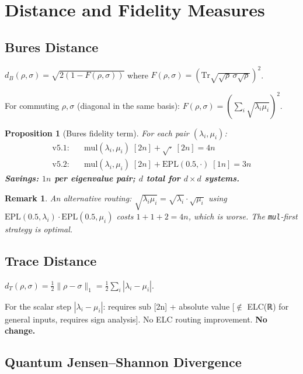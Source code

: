 \documentclass[11pt]{article}
\newtheorem{proposition}[theorem]{Proposition}
\newtheorem{remark}[theorem]{Remark}
\begin{document}
\section{Distance and Fidelity Measures}

\subsection{Bures Distance}

$d_B(\rho,\sigma)=\sqrt{2(1-F(\rho,\sigma))}$ where
$F(\rho,\sigma)=\left(\mathrm{Tr}\sqrt{\sqrt\rho\,\sigma\sqrt\rho}\right)^2$.

For commuting $\rho,\sigma$ (diagonal in the same basis):
$F(\rho,\sigma)=\left(\sum_i\sqrt{\lambda_i\mu_i}\right)^2$.

\begin{proposition}[Bures fidelity term]
For each pair $(\lambda_i,\mu_i)$:
\begin{align*}
\text{v5.1:} &\quad \mathrm{mul}(\lambda_i,\mu_i)\;[2n] + \sqrt{\cdot}\;[2n] = 4n \\
\text{v5.2:} &\quad \mathrm{mul}(\lambda_i,\mu_i)\;[2n] + \mathrm{EPL}(0.5,\cdot)\;[1n] = 3n
\end{align*}
\textbf{Savings: $1n$ per eigenvalue pair; $d$ total for $d\times d$ systems.}
\end{proposition}

\begin{remark}
An alternative routing: $\sqrt{\lambda_i\mu_i}=\sqrt{\lambda_i}\cdot\sqrt{\mu_i}$
using $\mathrm{EPL}(0.5,\lambda_i)\cdot\mathrm{EPL}(0.5,\mu_i)$ costs $1+1+2=4n$,
which is worse. The \texttt{mul}-first strategy is optimal.
\end{remark}

\subsection{Trace Distance}

$d_T(\rho,\sigma)=\tfrac12\|\rho-\sigma\|_1=\tfrac12\sum_i|\lambda_i-\mu_i|$.

For the scalar step $|\lambda_i-\mu_i|$: requires $\mathrm{sub}$ [2n] + absolute value
[$\notin$ ELC(ℝ) for general inputs, requires sign analysis].
No ELC routing improvement. \textbf{No change.}

\subsection{Quantum Jensen--Shannon Divergence}
\end{document}
